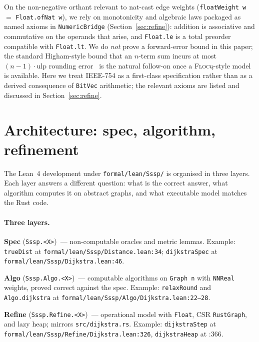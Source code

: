 \documentclass[11pt,a4paper]{article}
\makeatletter
\providecommand{\cref}[1]{Section~\ref{#1}}
\let\enitfb@itemize\itemize
\let\enitfb@enditemize\enditemize
\renewenvironment{itemize}[1][]{\enitfb@itemize}{\enitfb@enditemize}%
\newcommand{\Lean}{Lean~4\xspace}
\newcommand{\code}[1]{\texttt{#1}}
\theoremstyle{plain}
\theoremstyle{definition}
\makeatother
\begin{document}
On the non-negative orthant relevant to nat-cast edge weights
(\code{floatWeight w} $=$ \code{Float.ofNat w}), we rely on monotonicity and
algebraic laws packaged as named axioms in \code{NumericBridge}
(\cref{sec:refine}): addition is associative and commutative on the
operands that arise, and \code{Float.le} is a total preorder compatible
with \code{Float.lt}.
We do \emph{not} prove a forward-error bound in this paper; the standard
Higham-style bound that an $n$-term sum incurs at most
$(n-1)\cdot\mathrm{ulp}$ rounding error~\cite[Ch.~4]{Higham2002Accuracy}
is the natural follow-on once a \textsc{Flocq}-style model is available.
Here we treat IEEE-754 as a first-class specification rather than as a
derived consequence of \code{BitVec} arithmetic; the relevant axioms are
listed and discussed in \cref{sec:refine}.

\section{Architecture: spec, algorithm, refinement}\label{sec:architecture}

The \Lean{} development under \code{formal/lean/Sssp/} is organised in three
layers. Each layer answers a different question: what is the correct answer,
what algorithm computes it on abstract graphs, and what executable model
matches the Rust code.

\paragraph*{Three layers.}
\begin{itemize}[leftmargin=1.6em,itemsep=0.25em]
\item \textbf{Spec} (\code{Sssp.<X>})~--- non-computable oracles and metric
      lemmas. Example: \code{trueDist} at
      \code{formal/lean/Sssp/Distance.lean:34}; \code{dijkstraSpec} at
      \code{formal/lean/Sssp/Dijkstra.lean:46}.
\item \textbf{Algo} (\code{Sssp.Algo.<X>})~--- computable algorithms on
      \code{Graph n} with \code{NNReal} weights, proved correct against the
      spec. Example: \code{relaxRound} and \code{Algo.dijkstra} at
      \code{formal/lean/Sssp/Algo/Dijkstra.lean:22--28}.
\item \textbf{Refine} (\code{Sssp.Refine.<X>})~--- operational model with
      \code{Float}, CSR \code{RustGraph}, and lazy heap; mirrors
      \code{src/dijkstra.rs}. Example: \code{dijkstraStep} at
      \code{formal/lean/Sssp/Refine/Dijkstra.lean:326},
      \code{dijkstraHeap} at :366.
\end{itemize}
\end{document}

